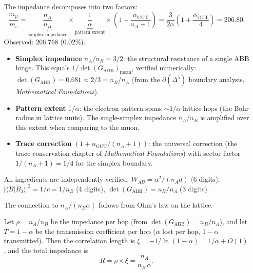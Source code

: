 The impedance decomposes into two factors:
\begin{equation}
\label{eq:mu_e}
\boxed{\frac{m_\mu}{m_e} = \underbrace{\frac{n_A}{n_B}}_{\text{simplex impedance}} \times \underbrace{\frac{1}{\alpha}}_{\text{pattern extent}} \times \left(1 + \frac{\alpha_\mathrm{GUT}}{n_A + 1}\right) = \frac{3}{2\alpha}\left(1 + \frac{\alpha_\mathrm{GUT}}{4}\right) = 206.80.}
\end{equation}
Observed: $206.768$ ($0.02\%$).

\begin{itemize}
\item \textbf{Simplex impedance} $n_A/n_B = 3/2$: the structural resistance of a single ABB hinge.  This equals $1/\det(G_\mathrm{ABB})_\mathrm{mean}$, verified numerically: $\det(G_\mathrm{ABB}) = 0.681 \approx 2/3 = n_B/n_A$ (from the $\partial(\Delta^5)$ boundary analysis, \textit{Mathematical Foundations}).

\item \textbf{Pattern extent} $1/\alpha$: the electron pattern spans $\sim 1/\alpha$ lattice hops (the Bohr radius in lattice units).  The single-simplex impedance $n_A/n_B$ is amplified over this extent when comparing to the muon.

\item \textbf{Trace correction} $(1 + \alpha_\mathrm{GUT}/(n_A+1))$: the universal correction (the trace conservation chapter of \textit{Mathematical Foundations}) with sector factor $1/(n_A+1) = 1/4$ for the simplex boundary.
\end{itemize}

All ingredients are independently verified: $W_{AB} = \alpha^2/(n_A d)$ (6 digits), $|\langle B|B_3\rangle|^2 = 1/c = 1/n_B$ (4 digits), $\det(G_\mathrm{ABB}) = n_B/n_A$ (3 digits).

The connection to $n_A/(n_B\alpha)$ follows from Ohm's law on the lattice.

\begin{theorem}
\label{thm:lepton_mass}
Let $\rho = n_A/n_B$ be the impedance per hop (from $\det(G_\mathrm{ABB}) = n_B/n_A$), and let $T = 1 - \alpha$ be the transmission coefficient per hop ($\alpha$ lost per hop, $1-\alpha$ transmitted).  Then the correlation length is $\xi = -1/\ln(1-\alpha) = 1/\alpha + O(1)$, and the total impedance is
\begin{equation}
R = \rho \times \xi = \frac{n_A}{n_B\,\alpha}.
\end{equation}
\end{theorem}

